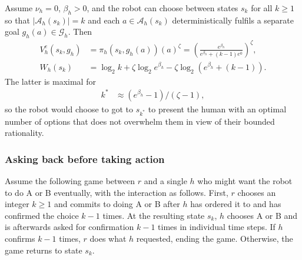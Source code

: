 \documentclass[letterpaper]{article} %
\def\A{\mathcal{A}}
\def\G{\mathcal{G}}
\begin{document}
Assume $\nu_h=0$, $\beta_h>0$, and the robot can choose between states $s_k$ for all $k\ge 1$ so that $|\A_h(s_k)|=k$ and each $a\in\A_h(s_k)$ deterministically fulfils a separate goal $g_h(a)\in\G_h$. 
Then 
\begin{align*}
    V^e_h(s_k,g_h) &= \pi_h(s_k,g_h(a))(a)^\zeta = \left(\frac{e^{\beta_h}}{e^{\beta_h} + (k-1)e^0}\right)^\zeta, \\
    W_h(s_k) &= \log_2 k + \zeta\log_2 e^{\beta_h} - \zeta\log_2(e^{\beta_h} + (k-1)).
\end{align*}
The latter is maximal for 
\begin{align*}
    k^\ast &\approx (e^{\beta_h}-1) / (\zeta-1), 
\end{align*}
so the robot would choose to got to $s_{k^\ast}$ to present the human with an optimal number of options that does not overwhelm them in view of their bounded rationality.

\subsubsection*{Asking back before taking action}

Assume the following game between $r$ and a single $h$ who might want the robot to do A or B eventually, with the interaction as follows.
First, $r$ chooses an integer $k\ge 1$ and commits to doing A or B after $h$ has ordered it to and has confirmed the choice $k-1$ times.
At the resulting state $s_k$, $h$ chooses A or B and is afterwards asked for confirmation $k-1$ times in individual time steps.
If $h$ confirms $k-1$ times, $r$ does what $h$ requested, ending the game.
Otherwise, the game returns to state $s_k$.
\end{document}
